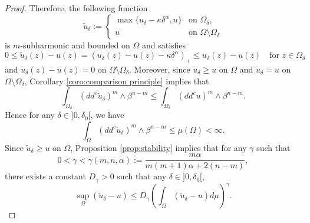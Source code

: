 \documentclass[JEP,XML,SOM,Unicode]{cedram}
\theoremstyle{definition}
\begin{document}
\begin{proof}
Therefore, the following function
\[
\tilde{u}_{\delta}:= \begin{cases}
\max\{{u}_{\delta} - \kappa \delta^{\alpha},u \} &\text{on } \Omega_{\delta}, \\
u &\text{on } \Omega\setminus\Omega_{\delta}
\end{cases}
\]
is $m$-subharmonic and bounded on $\Omega$ and satisfies
\[
0 \leq \tilde{u}_{\delta}(z) - u (z) =(u_\delta (z) - u (z) - \kappa \delta^{\alpha})_+ \leq u_\delta (z) - u (z)\quad \text{for }z\in \Omega_{\delta}
\]
and $\tilde{u}_{\delta}(z) - u (z) = 0$ on $\Omega \setminus \Omega_\delta$. Moreover, since $ \tilde{u}_{\delta} \geq u$ on $ \Omega$ and $\tilde{u}_{\delta} = u$ on $\Omega \setminus \Omega_\delta$, Corollary \ref{coro:comparison principle} implies that
\[
\int_{\Omega_\delta}(dd^c\tilde{u}_{\delta})^m\wedge\beta^{n-m}\leq\int_{\Omega_\delta}(dd^c u)^m\wedge\beta^{n-m}.
\]
Hence for any $\delta\in{}]0,\delta_0[$, we have
\[
\int_{\Omega}(dd^c\tilde{u}_{\delta})^m\wedge\beta^{n-m} \leq \mu (\Omega) < \infty.
\]
Since $\tilde u_\delta \geq u$ on $\Omega$, Proposition \ref{prop:stability} implies that for any $\gamma$ such that
\[
0<\gamma < \gamma (m,n,\alpha):= \frac{m \alpha}{ m (m + 1) \alpha + 2 (n-m)},
\]
there exists a constant $D_\gamma > 0$ such that any $\delta\in{}]0,\delta_0[$,
\begin{equation} \label{eq2}
\sup_{\Omega}(\tilde{u}_{\delta}-u) \leq D_{\gamma} \left(\int_{\Omega}(\tilde{u}_{\delta}-u) d\mu\right)^{\gamma}.
\end{equation}


\end{proof}
\end{document}
